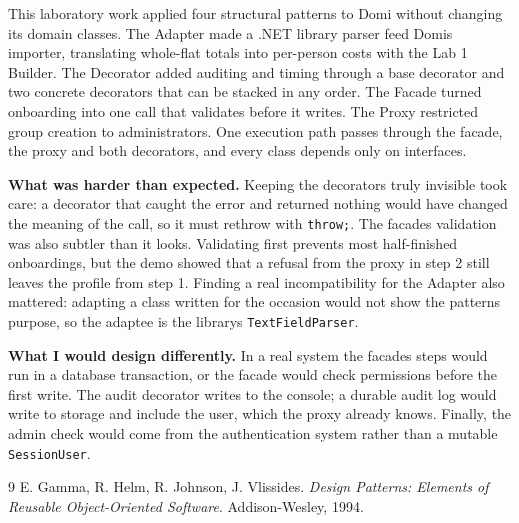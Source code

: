 \documentclass{utmreport}
\providecommand{\passthrough}[1]{#1}
\begin{document}
\utmconclusions
This laboratory work applied four structural patterns to Domi without changing its domain classes. The Adapter made a .NET library parser feed Domi\textquotesingle s importer, translating whole-flat totals into per-person costs with the Lab 1 Builder. The Decorator added auditing and timing through a base decorator and two concrete decorators that can be stacked in any order. The Facade turned onboarding into one call that validates before it writes. The Proxy restricted group creation to administrators. One execution path passes through the facade, the proxy and both decorators, and every class depends only on interfaces.

\textbf{What was harder than expected.} Keeping the decorators truly invisible took care: a decorator that caught the error and returned nothing would have changed the meaning of the call, so it must rethrow with \passthrough{\lstinline!throw;!}. The facade\textquotesingle s validation was also subtler than it looks. Validating first prevents most half-finished onboardings, but the demo showed that a refusal from the proxy in step 2 still leaves the profile from step 1. Finding a real incompatibility for the Adapter also mattered: adapting a class written for the occasion would not show the pattern\textquotesingle s purpose, so the adaptee is the library\textquotesingle s \passthrough{\lstinline!TextFieldParser!}.

\textbf{What I would design differently.} In a real system the facade\textquotesingle s steps would run in a database transaction, or the facade would check permissions before the first write. The audit decorator writes to the console; a durable audit log would write to storage and include the user, which the proxy already knows. Finally, the admin check would come from the authentication system rather than a mutable \passthrough{\lstinline!SessionUser!}.


\begin{thebibliography}{9}
 E. Gamma, R. Helm, R. Johnson, J. Vlissides. \textit{Design Patterns: Elements of Reusable Object-Oriented Software}. Addison-Wesley, 1994.
\end{thebibliography}
\end{document}
